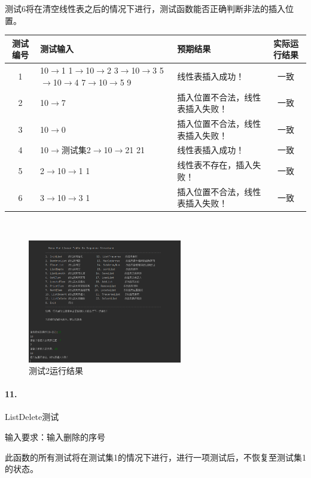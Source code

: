 \documentclass[supercite]{Experimental_Report}
\theoremstyle{definition}
\begin{document}
	测试6将在清空线性表之后的情况下进行，测试函数能否正确判断非法的插入位置。

\vspace{0.5em}

\begin{tabular}{|c|p{2.8cm}|p{5cm}|c|}
	\hline
	测试编号 & 测试输入 & 预期结果 & 实际运行结果 \\
	\hline
	1 & 10$\rightarrow$1 1$\rightarrow$10$\rightarrow$2 3$\rightarrow$10$\rightarrow$3 5$\rightarrow$10$\rightarrow$4 7$\rightarrow$10$\rightarrow$5 9 & 线性表插入成功！ & 一致 \\
	\hline
	2 & 10$\rightarrow$7 & 插入位置不合法，线性表插入失败！ & 一致 \\
	\hline
	3 & 10$\rightarrow$0 & 插入位置不合法，线性表插入失败！ & 一致 \\
	\hline
	4 & 10$\rightarrow$测试集2$\rightarrow$10$\rightarrow$21 21 & 线性表插入成功！ & 一致 \\
	\hline
	5 & 2$\rightarrow$10$\rightarrow$1 1 & 线性表不存在，插入失败！ & 一致 \\
	\hline
	6 & 3$\rightarrow$10$\rightarrow$3 1 & 插入位置不合法，线性表插入失败！ & 一致 \\
	\hline
\end{tabular}

~\

 \begin{figure}[H]
 	\centering
 	\includegraphics[width=0.6\textwidth]{images/线性表测试10.png}
 	\caption{测试2运行结果}
 	\label{txlab}
 \end{figure}


\paragraph{11.}ListDelete测试

	输入要求：输入删除的序号

	此函数的所有测试将在测试集1的情况下进行，进行一项测试后，不恢复至测试集1的状态。
\end{document}
